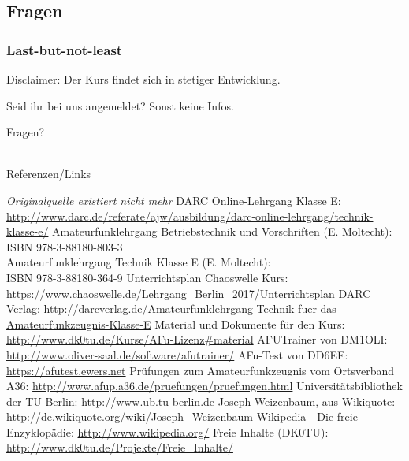 \subsection{Fragen}

\begin{frame}
    \frametitle{Last-but-not-least}

    Disclaimer: Der Kurs findet sich in stetiger Entwicklung.

    \bigskip
    \pause

    Seid ihr bei uns angemeldet? Sonst keine Infos.

    \bigskip
    \pause

    Fragen?

\end{frame}

\renewcommand{\refname}{Referenzen}

\hypertarget{refs}{}
\textcolor{white}{} \\ %
\Large Referenzen/Links
\footnotesize

\begin{thebibliography}{}
      \emph{Originalquelle existiert nicht mehr}
      DARC Online-Lehrgang Klasse E:
                    \url{http://www.darc.de/referate/ajw/ausbildung/darc-online-lehrgang/technik-klasse-e/}
     Amateurfunklehrgang Betriebstechnik und Vorschriften (E. Moltecht): \\
                    ISBN 978-3-88180-803-3 \\
                    Amateurfunklehrgang Technik Klasse E (E. Moltecht): \\
                    ISBN 978-3-88180-364-9
      Unterrichtsplan Chaoswelle Kurs: \\
                    \url{https://www.chaoswelle.de/Lehrgang_Berlin_2017/Unterrichtsplan}
     DARC Verlag:
                    \url{http://darcverlag.de/Amateurfunklehrgang-Technik-fuer-das-Amateurfunkzeugnis-Klasse-E}
       Material und Dokumente für den Kurs:
                    \url{http://www.dk0tu.de/Kurse/AFu-Lizenz#material}
      AFUTrainer von DM1OLI:
                    \url{http://www.oliver-saal.de/software/afutrainer/}
      AFu-Test von DD6EE:
                    \url{https://afutest.ewers.net}
      Prüfungen zum Amateurfunkzeugnis vom Ortsverband A36:
                    \url{http://www.afup.a36.de/pruefungen/pruefungen.html}
        Universitätsbibliothek der TU Berlin:
                    \url{http://www.ub.tu-berlin.de}
     Joseph Weizenbaum, aus Wikiquote:
                    \url{http://de.wikiquote.org/wiki/Joseph_Weizenbaum}
        Wikipedia - Die freie Enzyklopädie:
                    \url{http://www.wikipedia.org/}
        Freie Inhalte (DK0TU):
                    \url{http://www.dk0tu.de/Projekte/Freie_Inhalte/}
\end{thebibliography} 


